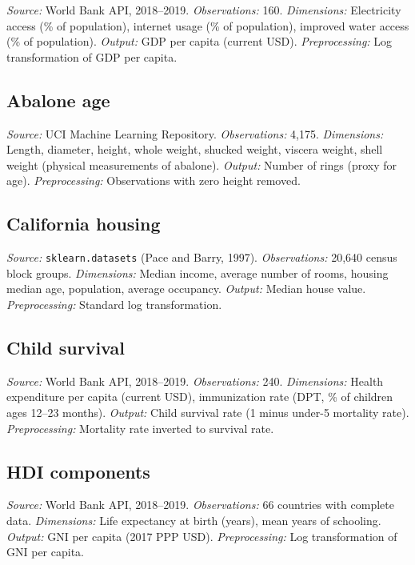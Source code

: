 \documentclass[12pt, a4paper]{article}
\theoremstyle{definition}
\theoremstyle{remark}
\begin{document}
\textit{Source:} World Bank API, 2018--2019. \textit{Observations:} 160. \textit{Dimensions:} Electricity access (\% of population), internet usage (\% of population), improved water access (\% of population). \textit{Output:} GDP per capita (current USD). \textit{Preprocessing:} Log transformation of GDP per capita.

\subsection{Abalone age}

\textit{Source:} UCI Machine Learning Repository. \textit{Observations:} 4,175. \textit{Dimensions:} Length, diameter, height, whole weight, shucked weight, viscera weight, shell weight (physical measurements of abalone). \textit{Output:} Number of rings (proxy for age). \textit{Preprocessing:} Observations with zero height removed.

\subsection{California housing}

\textit{Source:} \texttt{sklearn.datasets} (Pace and Barry, 1997). \textit{Observations:} 20,640 census block groups. \textit{Dimensions:} Median income, average number of rooms, housing median age, population, average occupancy. \textit{Output:} Median house value. \textit{Preprocessing:} Standard log transformation.

\subsection{Child survival}

\textit{Source:} World Bank API, 2018--2019. \textit{Observations:} 240. \textit{Dimensions:} Health expenditure per capita (current USD), immunization rate (DPT, \% of children ages 12--23 months). \textit{Output:} Child survival rate (1 minus under-5 mortality rate). \textit{Preprocessing:} Mortality rate inverted to survival rate.

\subsection{HDI components}

\textit{Source:} World Bank API, 2018--2019. \textit{Observations:} 66 countries with complete data. \textit{Dimensions:} Life expectancy at birth (years), mean years of schooling. \textit{Output:} GNI per capita (2017 PPP USD). \textit{Preprocessing:} Log transformation of GNI per capita.
\end{document}
